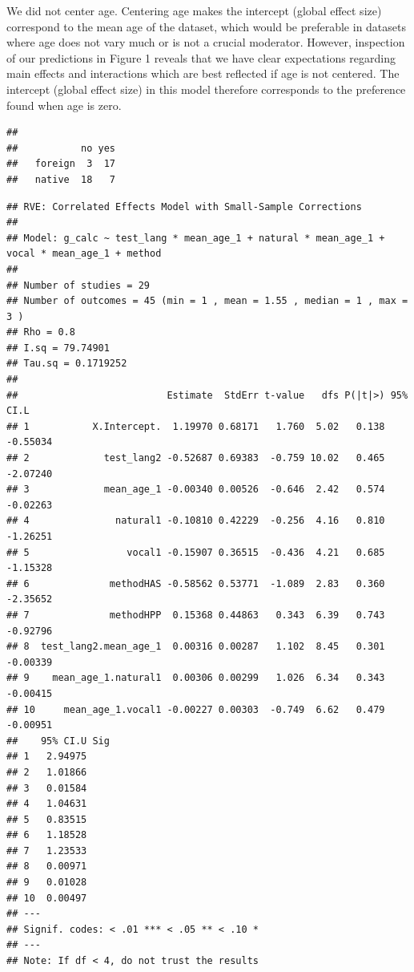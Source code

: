 \documentclass[]{apa6}
\begin{document}
We did not center age. Centering age makes the intercept (global effect
size) correspond to the mean age of the dataset, which would be
preferable in datasets where age does not vary much or is not a crucial
moderator. However, inspection of our predictions in Figure 1 reveals
that we have clear expectations regarding main effects and interactions
which are best reflected if age is not centered. The intercept (global
effect size) in this model therefore corresponds to the preference found
when age is zero.

\begin{verbatim}
##          
##           no yes
##   foreign  3  17
##   native  18   7
\end{verbatim}

\begin{verbatim}
## RVE: Correlated Effects Model with Small-Sample Corrections 
## 
## Model: g_calc ~ test_lang * mean_age_1 + natural * mean_age_1 + vocal * mean_age_1 + method 
## 
## Number of studies = 29 
## Number of outcomes = 45 (min = 1 , mean = 1.55 , median = 1 , max = 3 )
## Rho = 0.8 
## I.sq = 79.74901 
## Tau.sq = 0.1719252 
## 
##                          Estimate  StdErr t-value   dfs P(|t|>) 95% CI.L
## 1           X.Intercept.  1.19970 0.68171   1.760  5.02   0.138 -0.55034
## 2             test_lang2 -0.52687 0.69383  -0.759 10.02   0.465 -2.07240
## 3             mean_age_1 -0.00340 0.00526  -0.646  2.42   0.574 -0.02263
## 4               natural1 -0.10810 0.42229  -0.256  4.16   0.810 -1.26251
## 5                 vocal1 -0.15907 0.36515  -0.436  4.21   0.685 -1.15328
## 6              methodHAS -0.58562 0.53771  -1.089  2.83   0.360 -2.35652
## 7              methodHPP  0.15368 0.44863   0.343  6.39   0.743 -0.92796
## 8  test_lang2.mean_age_1  0.00316 0.00287   1.102  8.45   0.301 -0.00339
## 9    mean_age_1.natural1  0.00306 0.00299   1.026  6.34   0.343 -0.00415
## 10     mean_age_1.vocal1 -0.00227 0.00303  -0.749  6.62   0.479 -0.00951
##    95% CI.U Sig
## 1   2.94975    
## 2   1.01866    
## 3   0.01584    
## 4   1.04631    
## 5   0.83515    
## 6   1.18528    
## 7   1.23533    
## 8   0.00971    
## 9   0.01028    
## 10  0.00497    
## ---
## Signif. codes: < .01 *** < .05 ** < .10 *
## ---
## Note: If df < 4, do not trust the results
\end{verbatim}
\end{document}
